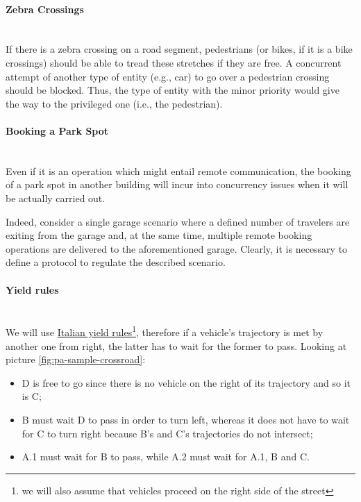 \paragraph{Zebra Crossings} \mbox{} \\

If there is a zebra crossing on a road segment, pedestrians (or bikes, if it
is a bike crossings) should be able to tread these stretches if they are free.
A concurrent attempt of another type of entity (e.g., car) to go over a
pedestrian crossing should be blocked. Thus, the type of
entity with the minor priority would give the way to the
privileged one (i.e., the pedestrian).

\paragraph{Booking a Park Spot} \mbox{} \\

Even if it is an operation which might entail remote communication, the booking
of a park spot in another building will incur into concurrency issues when it
will be actually carried out.

Indeed, consider a single garage scenario where a defined number of travelers
are exiting from the garage and, at the same time, multiple remote booking
operations are delivered to the aforementioned garage. Clearly,
it is necessary to define a protocol to regulate the described scenario.

\paragraph{Yield rules} \mbox{} \\

We will use \href{http://www.aci.it/i-servizi/normative/codice-della-strada/titolo-v-norme-di-comportamento/art-145-precedenza.html}{Italian yield rules}\footnote{we will also assume that vehicles proceed on the right side of the
street}, therefore if a vehicle's trajectory is met by another one from right,
the latter has to wait for the former to pass.
Looking at picture \ref{fig:pa-sample-crossroad}:
\begin{itemize}
    \item D is free to go since there is no vehicle on the right of its trajectory and so it is C;
    \item B must wait D to pass in order to turn left, whereas it does not have to wait
for C to turn right because B's and C's trajectories do not intersect;
    \item A.1 must wait for B to pass, while A.2 must wait for A.1, B and C.
\end{itemize}

